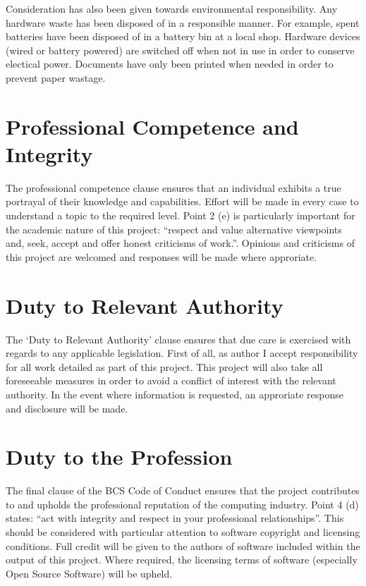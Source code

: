     Consideration has also been given towards environmental responsibility. Any hardware waste has been disposed of in a responsible manner. For example, spent batteries have been disposed of in a battery bin at a local shop. Hardware devices (wired or battery powered) are switched off when not in use in order to conserve electical power. Documents have only been printed when needed in order to prevent paper wastage. 

  \section{Professional Competence and Integrity}
    The professional competence clause ensures that an individual exhibits a true portrayal of their knowledge and capabilities. Effort will be made in every case to understand a topic to the required level. Point 2 (e) is particularly important for the academic nature of this project: ``respect and value alternative viewpoints and, seek, accept and offer honest criticisms of work.''. Opinions and criticisms of this project are welcomed and responses will be made where approriate. 

  \section{Duty to Relevant Authority}
    The `Duty to Relevant Authority' clause ensures that due care is exercised with regards to any applicable legislation. First of all, as author I accept responsibility for all work detailed as part of this project. This project will also take all foreseeable measures in order to avoid a conflict of interest with the relevant authority. In the event where information is requested, an approriate response and disclosure will be made.

  \section{Duty to the Profession}
    The final clause of the BCS Code of Conduct ensures that the project contributes to and upholds the professional reputation of the computing industry. Point 4 (d) states: ``act with integrity and respect in your professional relationships''. This should be considered with particular attention to software copyright and licensing conditions. Full credit will be given to the authors of software included within the output of this project. Where required, the licensing terms of software (especially Open Source Software) will be upheld.
